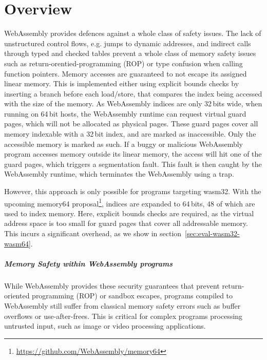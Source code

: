\chapter{Overview}
\label{ch:overview}

WebAssembly provides defences against a whole class of safety issues.
The lack of unstructured control flows, e.g. jumps to dynamic addresses, and indirect calls through typed and checked tables prevent a whole class of memory safety issues such as return-orentied-programming (ROP) or type confusion when calling function pointers.
Memory accesses are guaranteed to not escape its assigned linear memory.
This is implemented either using explicit bounds checks by inserting a branch before each load/store, that compares the index being accessed with the size of the memory.
As WebAssembly indices are only 32\,bits wide, when running on 64\,bit hosts, the WebAssembly runtime can request virtual guard pages, which will not be allocated as physical pages.
These guard pages cover all memory indexable with a 32\,bit index, and are marked as inaccessible.
Only the accessible memory is marked as such.
If a buggy or malicious WebAssembly program accesses memory outside its linear memory, the access will hit one of the guard pages, which triggers a segmentation fault.
This fault is then caught by the WebAssembly runtime, which terminates the WebAssembly using a trap.

However, this approach is only possible for programs targeting wasm32.
With the upcoming memory64 proposal\footnote{\url{https://github.com/WebAssembly/memory64}}, indices are expanded to 64\,bits, 48 of which are used to index memory.
Here, explicit bounds checks are required, as the virtual address space is too small for guard pages that cover all addressable memory.
This incurs a significant overhead, as we show in section~\ref{sec:eval-wasm32-wasm64}.

\paragraph{Memory Safety within WebAssembly programs}
While WebAssembly provides these security guarantees that prevent return-oriented programming (ROP) or sandbox escapes, programs compiled to WebAssembly still suffer from classical memory safety errors such as buffer overflows or use-after-frees.
This is critical for complex programs processing untrusted input, such as image or video processing applications.


